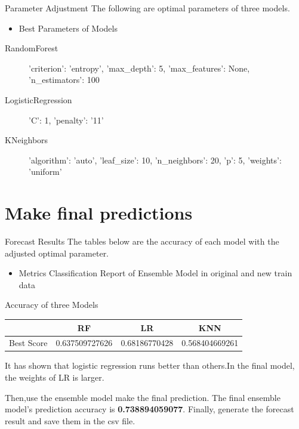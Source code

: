 \documentclass[
size=14pt,
paper=smartboard,  %
mode=present, 		%
display=slides, 	%
pauseslide,
fleqn,leqno]{powerdot}
\begin{document}
\begin{slide}{Parameter Adjustment}
	The following are optimal parameters of three models. 
	\begin{itemize}
		\item Best Parameters of Models
	\end{itemize}
	\begin{description}
	\item[RandomForest] 'criterion': 'entropy', 'max\_depth': 5, 
	'max\_features': None, 'n\_estimators': 100
	\item[LogisticRegression] 'C': 1, 'penalty': '11'
	
	\item[KNeighbors] 'algorithm': 'auto', 'leaf\_size': 10, 
	'n\_neighbors': 20, 'p': 5, 'weights': 'uniform'
	
\end{description}
	
\end{slide}



\section{Make final predictions}


\begin{slide}{Forecast Results}
The tables below are the accuracy of each model
with the adjusted optimal parameter.
\begin{itemize}
	\item Metrics Classification Report of Ensemble Model in original and new train data
\end{itemize}
\begin{center}
\item {Accuracy of three Models}
	\begin{tabular}{cccc}
	\toprule
	& RF  & LR  & KNN \\
	\midrule
	Best Score & 0.637509727626  & 0.68186770428  & 0.568404669261 \\
	\bottomrule
\end{tabular}
\end{center}
\begin{description}
	\item It has shown that logistic regression runs better than others.In the final model, the weights of LR is larger.
\end{description}
\begin{description}
	\item Then,use the ensemble model make the final prediction.	The final ensemble model's prediction accuracy is \textbf{0.738894059077}.
		\newline
	Finally, generate the forecast result and save them in the csv file.
\end{description}




\end{slide}
\end{document}
